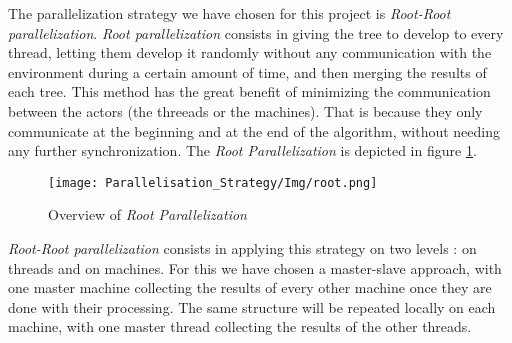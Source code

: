 The parallelization strategy we have chosen for this project is \emph{Root-Root parallelization}.
\emph{Root parallelization} consists in giving the tree to develop to every thread, letting them develop it randomly without any communication with the environment during a certain amount of time, and then merging the results of each tree.
This method has the great benefit of minimizing the communication between the actors (the threeads or the machines).
That is because they only communicate at the beginning and at the end of the algorithm, without needing any further synchronization.
The \textit{Root Parallelization} is depicted in figure \ref{fig:root}.

\begin{figure}[!ht] 
\centerline{\texttt{[image: Parallelisation\_Strategy/Img/root.png]}}
   \caption{Overview of \emph{Root Parallelization}} %
\label{fig:root}
\end{figure}

\emph{Root-Root parallelization} consists in applying this strategy on two levels : on threads and on machines.
For this we have chosen a master-slave approach, with one master machine collecting the results of every other machine once they are done with their processing.
The same structure will be repeated locally on each machine, with one master thread collecting the results of the other threads.